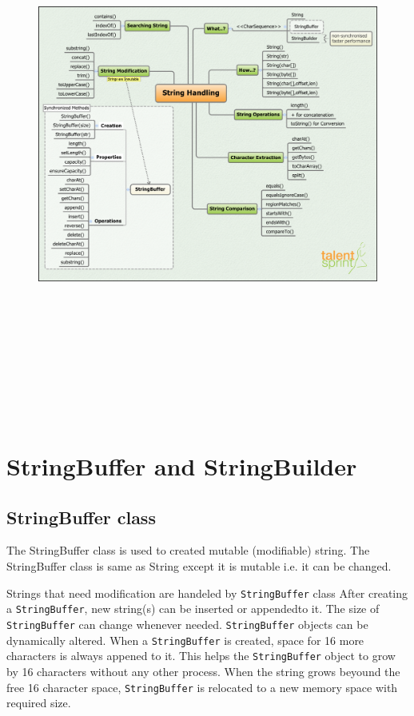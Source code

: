 \documentclass[11pt,a4paper]{article}
\begin{document}
\begin{figure}[H]
 \begin{center}
   \includegraphics[angle=90,height=18cm, width=12cm]{StringHandling.png}
   
 \end{center}
 \end{figure}
\section*{StringBuffer and StringBuilder}
\subsection*{StringBuffer class}
The StringBuffer class is used to created mutable (modifiable) string. The StringBuffer class is same as String except it is mutable i.e. it can be changed.

Strings that need modification are handeled by \lstinline!StringBuffer! class After creating a \lstinline!StringBuffer!, new string(s) can be inserted or appendedto it. The size of \lstinline!StringBuffer! can change whenever needed. \lstinline!StringBuffer! objects can be dynamically altered. When a \lstinline!StringBuffer! is created, space for 16 more characters is always appened to it. This helps the \lstinline!StringBuffer! object to grow by 16 characters without any other process. When the string grows beyound the free 16 character space, \lstinline!StringBuffer! is relocated to a new memory space with required size.
\end{document}

